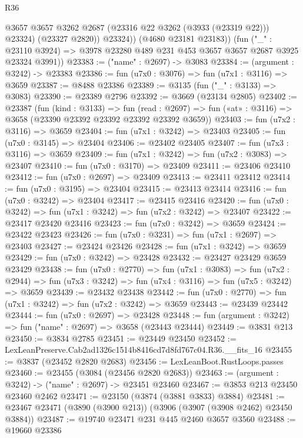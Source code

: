 \begin{lexlean}{R36}
\begin{coremodule}
                @3657
                @3657
                @3262
                @2687
                (@23316 @22 @3262 (@3933 (@23319 @22)))
                @23324)
              (@23327 @2820))
            @23324))
        (@4680 @23181 @23183))
      (fun ("_" : @23110 @3924) =>
      @3978 @23280 @489 @231 @453 @3657 @3657 @2687 @3925 @23324 @3991))
@23383 := ("name" : @2697) -> @3083
@23384 := (argument : @3242) -> @23383
@23386 := fun (u7x0 : @3076) => fun (u7x1 : @3116) => @3659
@23387 := @8488 @23386
@23389 := @3135 (fun ("_" : @3133) => @3083)
@23390 := @23389 @2796
@23392 := @3669 (@23134 @2805)
@23402 := @23387
    (fun (kind : @3133) =>
    fun (read : @2697) => fun («at» : @3116) => @3658 (@23390 @23392 @23392 @23392 @23392 @3659))
@23403 := fun (u7x2 : @3116) => @3659
@23404 := fun (u7x1 : @3242) => @23403
@23405 := fun (u7x0 : @3145) => @23404
@23406 := @23402 @23405
@23407 := fun (u7x3 : @3116) => @3659
@23409 := fun (u7x1 : @3242) => fun (u7x2 : @3083) => @23407
@23410 := fun (u7x0 : @3170) => @23409
@23411 := @23406 @23410
@23412 := fun (u7x0 : @2697) => @23409
@23413 := @23411 @23412
@23414 := fun (u7x0 : @3195) => @23404
@23415 := @23413 @23414
@23416 := fun (u7x0 : @3242) => @23404
@23417 := @23415 @23416
@23420 := fun (u7x0 : @3242) => fun (u7x1 : @3242) => fun (u7x2 : @3242) => @23407
@23422 := @23417 @23420 @23416
@23423 := fun (u7x0 : @3242) => @3659
@23424 := @23422 @23423
@23426 := fun (u7x0 : @3231) => fun (u7x1 : @2697) => @23403
@23427 := @23424 @23426
@23428 := fun (u7x1 : @3242) => @3659
@23429 := fun (u7x0 : @3242) => @23428
@23432 := @23427 @23429 @3659 @23429
@23438 := fun (u7x0 : @2770) =>
  fun (u7x1 : @3083) =>
  fun (u7x2 : @2944) => fun (u7x3 : @3242) => fun (u7x4 : @3116) => fun (u7x5 : @3242) => @3659
@23439 := @23432 @23438
@23442 := fun (u7x0 : @2770) => fun (u7x1 : @3242) => fun (u7x2 : @3242) => @3659
@23443 := @23439 @23442
@23444 := fun (u7x0 : @2697) => @23428
@23448 := fun (argument : @3242) => fun ("name" : @2697) => @3658 (@23443 @23444)
@23449 := @3831 @213
@23450 := @3834 @2785
@23451 := @23449 @23450
@23452 := LexLeanPreserve.Cab2ad1326c1514b8416cd7d8fd767c04.R36.__fits_16
@23455 := @3837 (@23452 @2820 @2683)
@23456 := LexLeanBoot.RustLoops.passes
@23460 := @23455 (@3084 (@23456 @2820 @2683))
@23463 := (argument : @3242) -> ("name" : @2697) -> @23451 @23460
@23467 := @3853 @213 @23450 @23460 @2462
@23471 := @23150 (@3874 (@3881 @3833) @3884)
@23481 := @23467 @23471 (@3890 (@3900 @213)) (@3906 (@3907 (@3908 @2462) @23450 @3884))
@23487 := @19740 @23471 @231 @445 @2460 @3657 @3560
@23488 := @19660 @23386

\end{coremodule}
\end{lexlean}
